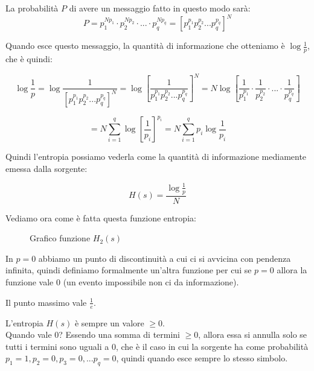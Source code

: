 La probabilità $P$ di avere un messaggio fatto in questo modo sarà:
\begin{equation*}
P = p_1^{Np_1} \cdot p_2^{Np_2} \cdot ... \cdot p_q^{Np_q} = [p_1^{p_1}p_2^{p_2}...p_q^{p_q}]^N
\end{equation*}

\newpage 

Quando esce questo messaggio, la quantità di informazione che otteniamo è $\log\frac{1}{p}$, che è quindi:

\begin{equation*}
\log\frac{1}{p} = \log\frac{1}{[p_1^{p_1}p_2^{p_2}...p_q^{p_q}]^N} = \log[\frac{1}{p_1^{p_1}p_2^{p_2}...p_q^{p_q}}]^N = N\log[\frac{1}{p_1^{p_1}} \cdot \frac{1}{p_2^{p_2}} \cdot ... \cdot \frac{1}{p_q^{p_q}}]
\end{equation*}


\begin{equation*}
= N \sum_{i=1}^q\log[\frac{1}{p_i}]^{p_i} = N \sum_{i=1}^qp_i\log\frac{1}{p_i}
\end{equation*}

Quindi l'entropia possiamo vederla come la quantità di informazione mediamente emessa dalla sorgente:

\begin{equation*}
H(s) = \frac{\log\frac{1}{p}}{N}
\end{equation*}

Vediamo ora come è fatta questa funzione entropia:

\begin{figure}[h]
	\centering
{}
\caption{Grafico funzione $H_2(s)$}
\end{figure}

In $p=0$ abbiamo un punto di discontinuità a cui ci si avvicina con pendenza infinita, quindi definiamo formalmente un'altra funzione per cui se $p=0$ allora la funzione vale 0 (un evento impossibile non ci da informazione).

Il punto massimo vale $\frac{1}{e}$.

L'entropia $H(s)$ è sempre un valore $\geq 0$.\\
Quando vale 0? Essendo una somma di termini $\geq 0$, allora essa si annulla solo se tutti i termini sono uguali a 0, che è il caso in cui la sorgente ha come probabilità $p_1 = 1, p_2 = 0, p_3 = 0, ... p_q = 0$, quindi quando esce sempre lo stesso simbolo.

